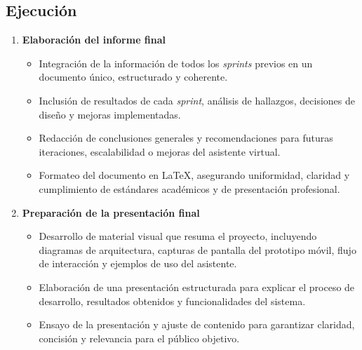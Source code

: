 \subsection{Ejecución}
\begin{enumerate}
      \item \textbf{Elaboración del informe final}
            \begin{itemize}
                  \item Integración de la información de todos los \textit{sprints} previos en un
                        documento único, estructurado y coherente.
                  \item Inclusión de resultados de cada \textit{sprint}, análisis de hallazgos,
                        decisiones de diseño y mejoras implementadas.
                  \item Redacción de conclusiones generales y recomendaciones para futuras iteraciones,
                        escalabilidad o mejoras del asistente virtual.
                  \item Formateo del documento en LaTeX, asegurando uniformidad, claridad y
                        cumplimiento de estándares académicos y de presentación profesional.
            \end{itemize}

      \item \textbf{Preparación de la presentación final}
            \begin{itemize}
                  \item Desarrollo de material visual que resuma el proyecto, incluyendo diagramas de
                        arquitectura, capturas de pantalla del prototipo móvil, flujo de interacción y
                        ejemplos de uso del asistente.
                  \item Elaboración de una presentación estructurada para explicar el proceso de
                        desarrollo, resultados obtenidos y funcionalidades del sistema.
                  \item Ensayo de la presentación y ajuste de contenido para garantizar claridad,
                        concisión y relevancia para el público objetivo.
            \end{itemize}


\end{enumerate}
